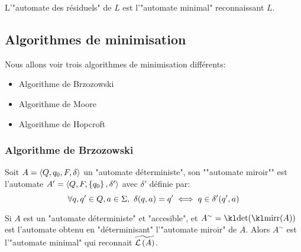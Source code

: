 L'"automate des résiduels" de $L$ est l'"automate minimal" reconnaissant $L$.

\subsection{Algorithmes de minimisation}


Nous allons voir trois algorithmes de minimisation différents:
\begin{itemize}
	\item Algorithme de Brzozowski
	\item Algorithme de Moore
	\item Algorithme de Hopcroft
\end{itemize}


\subsubsection{Algorithme de Brzozowski}


\begin{definition}
	Soit $A = \langle Q, q_0, F, \delta \rangle$ un "automate déterministe", son ""automate miroir"" est l'automate $A' = \langle Q, F, \left\{q_0\right\}, \delta' \rangle$ avec
	$\delta'$ définie par:
	$$\forall q,q' \in Q, a \in \Sigma, \ \delta(q,a) = q' \iff q \in \delta'(q',a)$$
\end{definition}


\begin{prop}
	Si $A$ est un "automate déterministe" et "accesible", et  $A^ {\sim} = \detA (\mirr(A)) $ est l'automate
	obtenu en "déterminisant" l'"automate miroir" de $A$. Alors $A^{\sim}$ est l'"automate minimal" qui
	reconnait $\widetilde{\mathcal{L}\left(A\right)}$.
\end{prop}


